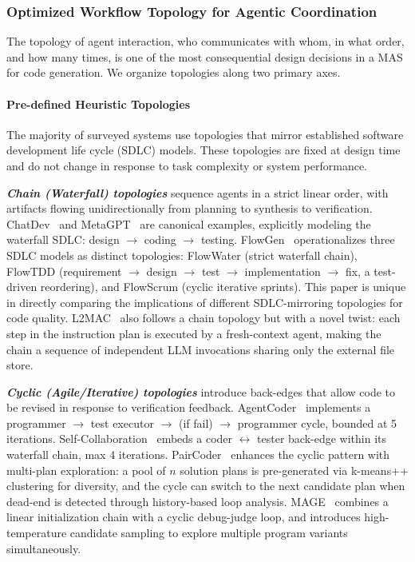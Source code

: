 \documentclass{llmxive}
\begin{document}
\subsubsection{Optimized Workflow Topology for Agentic Coordination}

The topology of agent interaction, who communicates with whom, in
what order, and how many times, is one of the most consequential
design decisions in a MAS for code generation. We organize
topologies along two primary axes.

\paragraph{Pre-defined Heuristic Topologies}
The majority of surveyed systems use topologies that mirror
established software development life cycle (SDLC) models. These
topologies are fixed at design time and do not change in response
to task complexity or system performance.

\textbf{\textit{Chain (Waterfall) topologies}} sequence agents in
a strict linear order, with artifacts flowing unidirectionally
from planning to synthesis to verification. ChatDev~\cite{Qian2023ChatDev}
and MetaGPT~\cite{Hong2023MetaGPT} are canonical examples,
explicitly modeling the waterfall SDLC: design $\rightarrow$
coding $\rightarrow$ testing. FlowGen~\cite{Lin2025Soen101}
operationalizes three SDLC models as distinct topologies:
FlowWater (strict waterfall chain), FlowTDD (requirement
$\rightarrow$ design $\rightarrow$ test $\rightarrow$
implementation $\rightarrow$ fix, a test-driven reordering), and
FlowScrum (cyclic iterative sprints). This paper is unique in
directly comparing the implications of different
SDLC-mirroring topologies for code quality.
L2MAC~\cite{Holt2023L2MAC} also follows a chain topology but with
a novel twist: each step in the instruction plan is executed by a
fresh-context agent, making the chain a sequence of independent
LLM invocations sharing only the external file store.

\textbf{\textit{Cyclic (Agile/Iterative) topologies}} introduce
back-edges that allow code to be revised in response to
verification feedback. AgentCoder~\cite{huang2023agentcoder}
implements a programmer $\rightarrow$ test executor $\rightarrow$
(if fail) $\rightarrow$ programmer cycle, bounded at 5
iterations. Self-Collaboration~\cite{Dong2024SelfCollaboration}
embeds a coder $\leftrightarrow$ tester back-edge within its
waterfall chain, max 4 iterations.
PairCoder~\cite{Zhang2024PairProgramming} enhances the cyclic
pattern with multi-plan exploration: a pool of $n$ solution plans
is pre-generated via k-means++ clustering for diversity, and the
cycle can switch to the next candidate plan when dead-end is
detected through history-based loop analysis.
MAGE~\cite{Zhao2024MAGE} combines a linear initialization chain
with a cyclic debug-judge loop, and introduces high-temperature
candidate sampling to explore multiple program variants
simultaneously.
\end{document}
